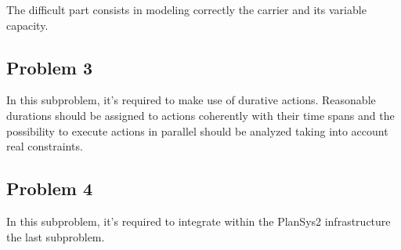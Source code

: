 The difficult part consists in modeling correctly the carrier and its variable capacity.

\subsection{Problem 3}
In this subproblem, it's required to make use of durative actions.
Reasonable durations should be assigned to actions coherently with their time spans and the possibility 
to execute actions in parallel should be analyzed taking into account real constraints.

\subsection{Problem 4}
In this subproblem, it's required to integrate within the PlanSys2 infrastructure the last subproblem.

